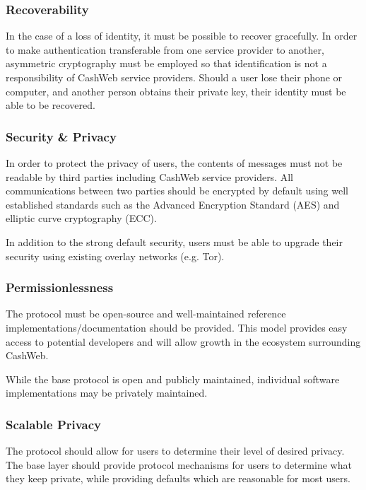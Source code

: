 \documentclass{article}
\begin{document}
\subsubsection{Recoverability}

In the case of a loss of identity, it must be possible to recover gracefully. In order to make authentication transferable from one service provider to another, asymmetric cryptography must be employed so that identification is not a responsibility of CashWeb service providers. Should a user lose their phone or computer, and another person obtains their private key, their identity must be able to be recovered.

\subsubsection{Security \& Privacy}

In order to protect the privacy of users, the contents of messages must not be readable by third parties including CashWeb service providers. All communications between two parties should be encrypted by default using well established standards such as the Advanced Encryption Standard (AES) and elliptic curve cryptography (ECC).

In addition to the strong default security, users must be able to upgrade their security using existing overlay networks (e.g. Tor).

\subsubsection{Permissionlessness}

The protocol must be open-source and well-maintained reference implementations/documentation should be provided. This model provides easy access to potential developers and will allow growth in the ecosystem surrounding CashWeb.

While the base protocol is open and publicly maintained, individual software implementations may be privately maintained.

\subsubsection{Scalable Privacy}

The protocol should allow for users to determine their level of desired privacy. The base layer should provide protocol mechanisms for users to determine what they keep private, while providing defaults which are reasonable for most users.
\end{document}
